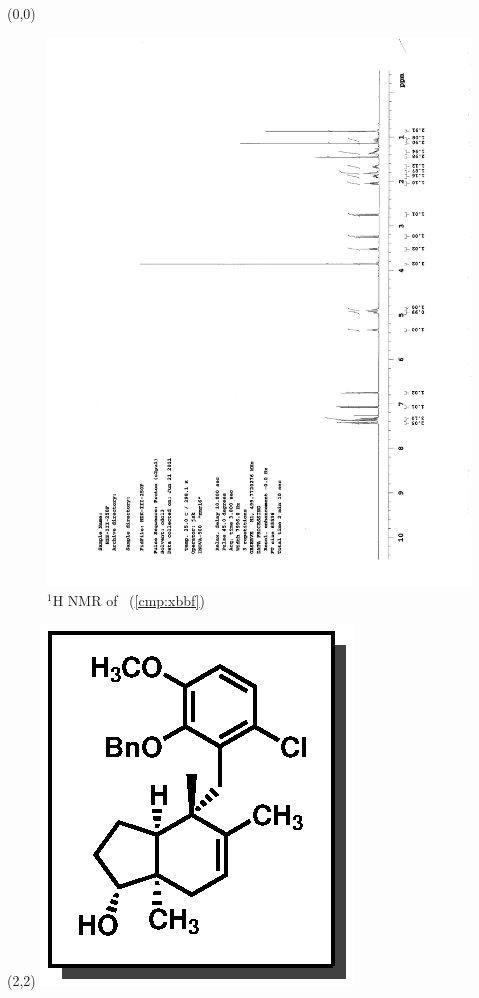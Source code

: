 \begin{textblock}{20}(0,0)
\begin{figure}[htb]
\caption{$^1$H NMR of \CMPxbbf\ (\ref{cmp:xbbf})}
\includegraphics[scale=0.75, trim = 0mm 0mm 0mm 5mm,
clip]{chp_singlecarbon/images/nmr/xbbfH}
\vspace{-100pt}
\end{figure}
\end{textblock}
\begin{textblock}{1}(2,2)
\includegraphics[scale=0.8, angle=90]{chp_singlecarbon/images/xbbf}
\end{textblock}
